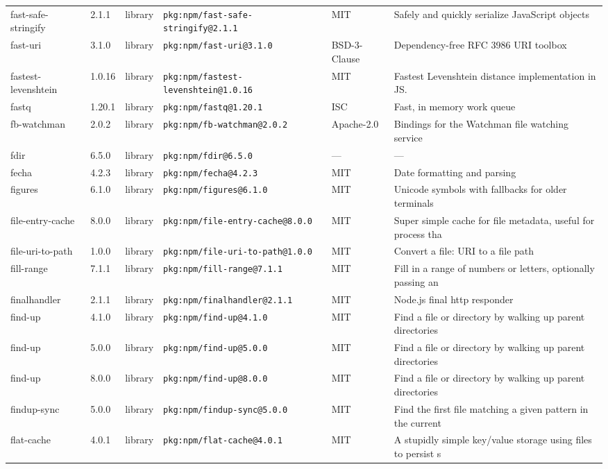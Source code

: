 \documentclass[11pt]{article}
\begin{document}
\begin{longtable}{|l|l|l|p{2.2cm}|l|p{4cm}|}
fast-safe-stringify & 2.1.1 & library & \texttt{pkg:npm/fast-safe-stringify@2.1.1} & MIT & Safely and quickly serialize JavaScript objects \\
fast-uri & 3.1.0 & library & \texttt{pkg:npm/fast-uri@3.1.0} & BSD-3-Clause & Dependency-free RFC 3986 URI toolbox \\
fastest-levenshtein & 1.0.16 & library & \texttt{pkg:npm/fastest-levenshtein@1.0.16} & MIT & Fastest Levenshtein distance implementation in JS. \\
fastq & 1.20.1 & library & \texttt{pkg:npm/fastq@1.20.1} & ISC & Fast, in memory work queue \\
fb-watchman & 2.0.2 & library & \texttt{pkg:npm/fb-watchman@2.0.2} & Apache-2.0 & Bindings for the Watchman file watching service \\
fdir & 6.5.0 & library & \texttt{pkg:npm/fdir@6.5.0} & — & — \\
fecha & 4.2.3 & library & \texttt{pkg:npm/fecha@4.2.3} & MIT & Date formatting and parsing \\
figures & 6.1.0 & library & \texttt{pkg:npm/figures@6.1.0} & MIT & Unicode symbols with fallbacks for older terminals \\
file-entry-cache & 8.0.0 & library & \texttt{pkg:npm/file-entry-cache@8.0.0} & MIT & Super simple cache for file metadata, useful for process tha \\
file-uri-to-path & 1.0.0 & library & \texttt{pkg:npm/file-uri-to-path@1.0.0} & MIT & Convert a file: URI to a file path \\
fill-range & 7.1.1 & library & \texttt{pkg:npm/fill-range@7.1.1} & MIT & Fill in a range of numbers or letters, optionally passing an \\
finalhandler & 2.1.1 & library & \texttt{pkg:npm/finalhandler@2.1.1} & MIT & Node.js final http responder \\
find-up & 4.1.0 & library & \texttt{pkg:npm/find-up@4.1.0} & MIT & Find a file or directory by walking up parent directories \\
find-up & 5.0.0 & library & \texttt{pkg:npm/find-up@5.0.0} & MIT & Find a file or directory by walking up parent directories \\
find-up & 8.0.0 & library & \texttt{pkg:npm/find-up@8.0.0} & MIT & Find a file or directory by walking up parent directories \\
findup-sync & 5.0.0 & library & \texttt{pkg:npm/findup-sync@5.0.0} & MIT & Find the first file matching a given pattern in the current  \\
flat-cache & 4.0.1 & library & \texttt{pkg:npm/flat-cache@4.0.1} & MIT & A stupidly simple key/value storage using files to persist s \\

\end{longtable}
\end{document}
